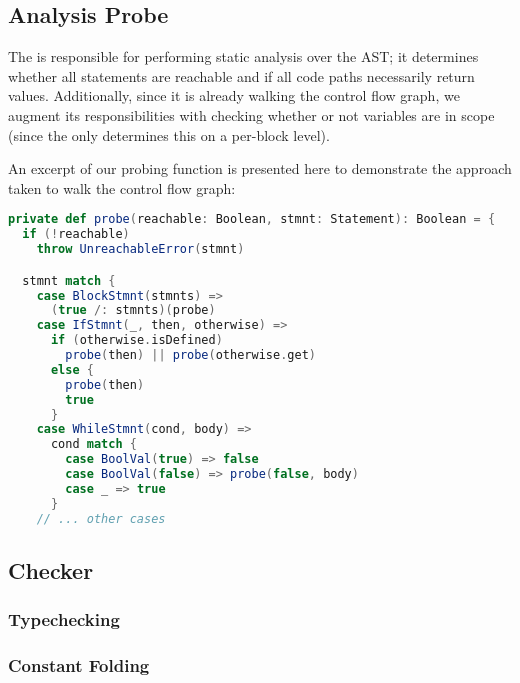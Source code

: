 \documentclass{article}
\begin{document}
\subsection{Analysis Probe}
The  is responsible for performing static analysis over the AST; it determines whether all
statements are reachable and if all code paths necessarily return values. Additionally, since it is already walking the
control flow graph, we augment its responsibilities with checking whether or not variables are in scope (since the
 only determines this on a per-block level).

An excerpt of our probing function is presented here to demonstrate the approach taken to walk the control flow graph:

\begin{lstlisting}[language=Scala]
private def probe(reachable: Boolean, stmnt: Statement): Boolean = {
  if (!reachable)
    throw UnreachableError(stmnt)

  stmnt match {
    case BlockStmnt(stmnts) =>
      (true /: stmnts)(probe)
    case IfStmnt(_, then, otherwise) =>
      if (otherwise.isDefined)
        probe(then) || probe(otherwise.get)
      else {
        probe(then)
        true
      }
    case WhileStmnt(cond, body) =>
      cond match {
        case BoolVal(true) => false
        case BoolVal(false) => probe(false, body)
        case _ => true
      }
    // ... other cases
\end{lstlisting}



\subsection{Checker}
\subsubsection{Typechecking}
\subsubsection{Constant Folding}

\begin{lstlisting}[language=Scala]
\end{lstlisting}
\end{document}

